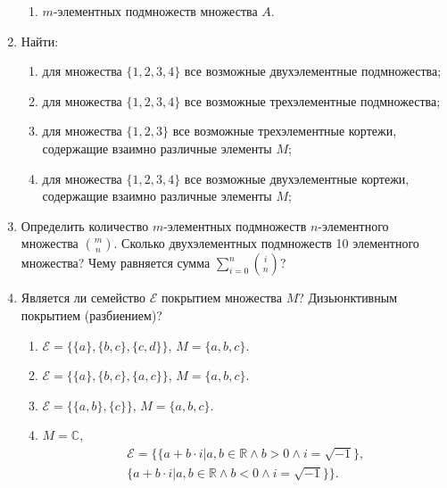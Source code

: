 \begin{enumerate}
\begin{enumerate}
        \item $m$-элементных подмножеств множества $A$.
    \end{enumerate}
    
    \item Найти:
    \begin{enumerate}
        \item для множества $\{1,2,3,4\}$ все возможные двухэлементные подмножества;
        \item для множества $\{1,2,3,4\}$ все возможные трехэлементные подмножества;
        \item для множества $\{1,2,3\}$ все возможные трехэлементные кортежи, содержащие взаимно различные элементы $M$;
        \item для множества $\{1,2,3,4\}$ все возможные двухэлементные кортежи, содержащие взаимно различные элементы $M$;
    \end{enumerate}
    
    \item Определить количество $m$-элементных подмножеств $n$-элементного множества $\binom{m}{n}$. Сколько двухэлементных подмножеств 10 элементного множества? Чему равняется сумма $\sum_{i=0}^n \binom{i}{n}$?
    
    \item Является ли семейство $\mathcal{E}$ покрытием множества $M$? Дизьюнктивным покрытием (разбиением)?
    \begin{enumerate}
        \item $\mathcal{E}=\{\{a\},\{b,c\},\{c,d\}\}$, $M=\{a,b,c\}$.
        \item $\mathcal{E}=\{\{a\},\{b,c\},\{a,c\}\}$, $M=\{a,b,c\}$.
        \item $\mathcal{E}=\{\{a,b\},\{c\}\}$, $M=\{a,b,c\}$.
        \item $M=\mathbb{C}$,
        \[
        \begin{split}
            \mathcal{E}=\{
                \{a+b\cdot i|a,b\in\mathbb{R}\land b>0\land i=\sqrt{-1}\},\\
                \{a+b\cdot i|a,b\in\mathbb{R}\land b<0\land i=\sqrt{-1}\}
            \}.
        \end{split}
        \]
    \end{enumerate}
    

\end{enumerate}
